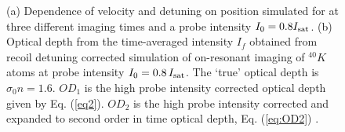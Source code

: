 \documentclass[12pt]{iopart}
\begin{document}
\begin{figure}
\caption{(a) Dependence of velocity and detuning on position simulated for \K{} at three different imaging times and a probe intensity $I_0=0.8 I_{\rm{sat}}$. (b) Optical depth from the time-averaged intensity $I_f$ obtained from recoil detuning corrected simulation of on-resonant imaging of $^{40}K$ atoms at probe intensity $I_0=0.8\, I_{\rm{sat}}$. The `true' optical depth is $\sigma_0 n=1.6$. $OD_1$ is the high probe intensity corrected optical depth given by Eq. (\ref{eq2}). $OD_2$ is the high probe intensity corrected and expanded to second order in time optical depth, Eq. (\ref{eq:OD2}) \cite{LJLthesis}.}  
\label{fig:expos}
\end{figure}
\end{document}
